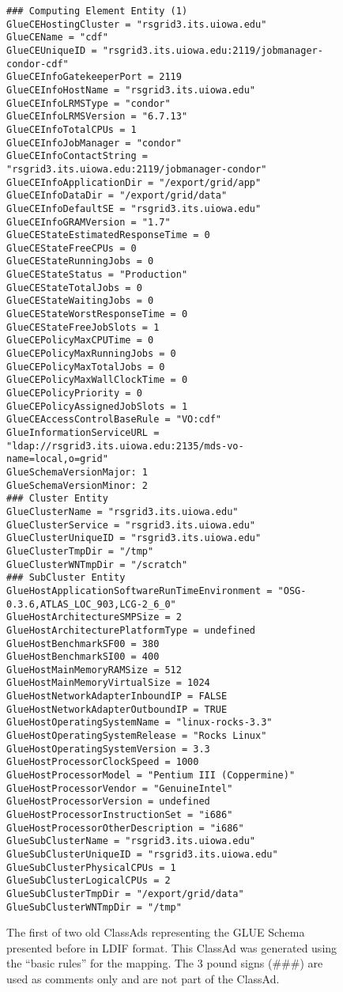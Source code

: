 \documentclass[12pt]{article}
\begin{document}
\begin{figure}
\scriptsize
\begin{verbatim}
### Computing Element Entity (1)
GlueCEHostingCluster = "rsgrid3.its.uiowa.edu"
GlueCEName = "cdf"
GlueCEUniqueID = "rsgrid3.its.uiowa.edu:2119/jobmanager-condor-cdf"
GlueCEInfoGatekeeperPort = 2119
GlueCEInfoHostName = "rsgrid3.its.uiowa.edu"
GlueCEInfoLRMSType = "condor"
GlueCEInfoLRMSVersion = "6.7.13"
GlueCEInfoTotalCPUs = 1
GlueCEInfoJobManager = "condor"
GlueCEInfoContactString = "rsgrid3.its.uiowa.edu:2119/jobmanager-condor"
GlueCEInfoApplicationDir = "/export/grid/app"
GlueCEInfoDataDir = "/export/grid/data"
GlueCEInfoDefaultSE = "rsgrid3.its.uiowa.edu"
GlueCEInfoGRAMVersion = "1.7"
GlueCEStateEstimatedResponseTime = 0
GlueCEStateFreeCPUs = 0
GlueCEStateRunningJobs = 0
GlueCEStateStatus = "Production"
GlueCEStateTotalJobs = 0
GlueCEStateWaitingJobs = 0
GlueCEStateWorstResponseTime = 0
GlueCEStateFreeJobSlots = 1
GlueCEPolicyMaxCPUTime = 0
GlueCEPolicyMaxRunningJobs = 0
GlueCEPolicyMaxTotalJobs = 0
GlueCEPolicyMaxWallClockTime = 0
GlueCEPolicyPriority = 0
GlueCEPolicyAssignedJobSlots = 1
GlueCEAccessControlBaseRule = "VO:cdf"
GlueInformationServiceURL = "ldap://rsgrid3.its.uiowa.edu:2135/mds-vo-name=local,o=grid"
GlueSchemaVersionMajor: 1
GlueSchemaVersionMinor: 2
### Cluster Entity
GlueClusterName = "rsgrid3.its.uiowa.edu"
GlueClusterService = "rsgrid3.its.uiowa.edu"
GlueClusterUniqueID = "rsgrid3.its.uiowa.edu"
GlueClusterTmpDir = "/tmp"
GlueClusterWNTmpDir = "/scratch"
### SubCluster Entity
GlueHostApplicationSoftwareRunTimeEnvironment = "OSG-0.3.6,ATLAS_LOC_903,LCG-2_6_0"
GlueHostArchitectureSMPSize = 2
GlueHostArchitecturePlatformType = undefined
GlueHostBenchmarkSF00 = 380
GlueHostBenchmarkSI00 = 400
GlueHostMainMemoryRAMSize = 512
GlueHostMainMemoryVirtualSize = 1024
GlueHostNetworkAdapterInboundIP = FALSE
GlueHostNetworkAdapterOutboundIP = TRUE
GlueHostOperatingSystemName = "linux-rocks-3.3"
GlueHostOperatingSystemRelease = "Rocks Linux"
GlueHostOperatingSystemVersion = 3.3
GlueHostProcessorClockSpeed = 1000
GlueHostProcessorModel = "Pentium III (Coppermine)"
GlueHostProcessorVendor = "GenuineIntel"
GlueHostProcessorVersion = undefined
GlueHostProcessorInstructionSet = "i686"
GlueHostProcessorOtherDescription = "i686"
GlueSubClusterName = "rsgrid3.its.uiowa.edu"
GlueSubClusterUniqueID = "rsgrid3.its.uiowa.edu"
GlueSubClusterPhysicalCPUs = 1
GlueSubClusterLogicalCPUs = 2
GlueSubClusterTmpDir = "/export/grid/data"
GlueSubClusterWNTmpDir = "/tmp"
\end{verbatim}
\normalsize \caption[Example of an old ClassAd representation of the
GLUE Schema]{\label{CLASSAD-Basic-1-Example} The first of two old
ClassAds representing the GLUE Schema presented before in LDIF
format. This ClassAd was generated using the ``basic rules'' for the
mapping. The 3 pound signs (\#\#\#) are used as comments only and
are not part of the ClassAd.}
\end{figure}
\end{document}
